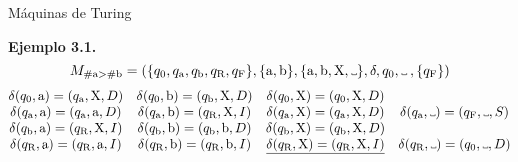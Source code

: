 \documentclass[10pt,xcolor=dvipsnames,aspectratio=169,spanish]{beamer}
\newcommand\Vtextvisiblespace[1][.3em]{%
\mbox{\kern.06em\vrule height.3ex}%
\vbox{\hrule width#1}%
\hbox{\vrule height.3ex}}
\begin{document}
\begin{frame}{Máquinas de Turing}

\textbf{Ejemplo 3.1}\textbf{.}
$$
    M_{\#\text{a}>\#\text{b}}=(\{q_0, q_\text{a}, q_\text{b}, q_\text{R}, q_\text{F}\}, \{\text{a}, \text{b}\}, \{\text{a}, \text{b}, \text{X}, \Vtextvisiblespace\}, \delta, q_0, \Vtextvisiblespace\:,\{q_\text{F}\})
$$
$$
    \begin{matrix}
        \delta(q_0, \text{a}) = (q_\text{a},\text{X},D) & \delta(q_0, \text{b}) = (q_\text{b},\text{X},D) & \delta(q_0, \text{X}) = (q_0,\text{X},D) &  \\
        \delta(q_\text{a}, \text{a}) = (q_\text{a},\text{a},D) & \delta(q_\text{a}, \text{b}) = (q_\text{R},\text{X},I) & \delta(q_\text{a}, \text{X}) = (q_\text{a},\text{X},D) & \delta(q_\text{a}, \Vtextvisiblespace) = (q_\text{F},\Vtextvisiblespace,S) \\
        \delta(q_\text{b}, \text{a}) = (q_\text{R},\text{X},I) & \delta(q_\text{b}, \text{b}) = (q_\text{b},\text{b},D) & \delta(q_\text{b}, \text{X}) = (q_\text{b},\text{X},D) &  \\
        \delta(q_\text{R}, \text{a}) = (q_\text{R},\text{a},I) & \delta(q_\text{R}, \text{b}) = (q_\text{R},\text{b},I) & \underline{\delta(q_\text{R}, \text{X}) = (q_\text{R},\text{X},I)} & \delta(q_\text{R}, \Vtextvisiblespace) = (q_0,\Vtextvisiblespace,D) \\
    \end{matrix}
$$

\vspace{5mm}

\begin{adjustbox}{max height={.67\textheight},center}

\end{adjustbox}

\end{frame}
\end{document}
